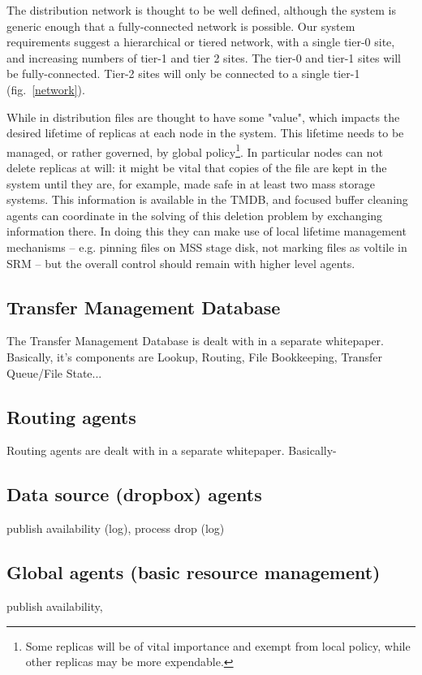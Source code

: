 \documentclass{cmspaper}
\begin{document}
The distribution network is thought to be well defined, although the system is generic enough that a fully-connected network is possible.  Our system requirements suggest a hierarchical or tiered network, with a single tier-0 site, and increasing numbers of tier-1 and tier 2 sites.  The tier-0 and tier-1 sites will be fully-connected.  Tier-2 sites will only be connected to a single tier-1 (fig.~\ref{network}).

While in distribution files are thought to have some "value", which impacts the desired lifetime of replicas at each node in the system.  This lifetime needs to be managed, or rather governed, by global policy\footnote{Some replicas will be of vital importance and exempt from local policy, while other replicas may be more expendable.}.  In particular nodes can not delete replicas at will: it might be vital that copies of the file are kept in the system until they are, for example, made safe in at least two mass storage systems.  This information is available in the TMDB, and focused buffer cleaning agents can coordinate in the solving of this deletion problem by exchanging information there.  In doing this they can make use of local lifetime management mechanisms -- e.g. pinning files on MSS stage disk, not marking files as voltile in SRM -- but the overall control should remain with higher level agents.

\subsection{Transfer Management Database}
The Transfer Management Database is dealt with in a separate whitepaper. Basically, it's components are Lookup, Routing, File Bookkeeping, Transfer Queue/File State...

\subsection{Routing agents}
Routing agents are dealt with in a separate whitepaper. Basically-

\subsection{Data source (dropbox) agents}
publish availability (log), process drop (log)

\subsection{Global agents (basic resource management)}
publish availability,
\end{document}

